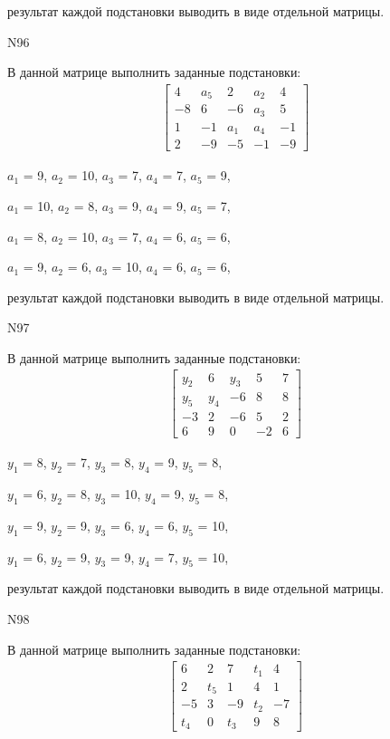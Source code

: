 \documentclass[11pt]{report}
\begin{document}
результат каждой подстановки выводить в виде отдельной матрицы.

N96

В данной матрице выполнить заданные подстановки:
\begin{align*}
\left[\begin{matrix}4 & a_{5} & 2 & a_{2} & 4\\-8 & 6 & -6 & a_{3} & 5\\1 & -1 & a_{1} & a_{4} & -1\\2 & -9 & -5 & -1 & -9\end{matrix}\right]
\end{align*}


$a_{1}$ = 9, $a_{2}$ = 10, $a_{3}$ = 7, $a_{4}$ = 7, $a_{5}$ = 9, 

$a_{1}$ = 10, $a_{2}$ = 8, $a_{3}$ = 9, $a_{4}$ = 9, $a_{5}$ = 7, 

$a_{1}$ = 8, $a_{2}$ = 10, $a_{3}$ = 7, $a_{4}$ = 6, $a_{5}$ = 6, 

$a_{1}$ = 9, $a_{2}$ = 6, $a_{3}$ = 10, $a_{4}$ = 6, $a_{5}$ = 6, 

результат каждой подстановки выводить в виде отдельной матрицы.

N97

В данной матрице выполнить заданные подстановки:
\begin{align*}
\left[\begin{matrix}y_{2} & 6 & y_{3} & 5 & 7\\y_{5} & y_{4} & -6 & 8 & 8\\-3 & 2 & -6 & 5 & 2\\6 & 9 & 0 & -2 & 6\end{matrix}\right]
\end{align*}


$y_{1}$ = 8, $y_{2}$ = 7, $y_{3}$ = 8, $y_{4}$ = 9, $y_{5}$ = 8, 

$y_{1}$ = 6, $y_{2}$ = 8, $y_{3}$ = 10, $y_{4}$ = 9, $y_{5}$ = 8, 

$y_{1}$ = 9, $y_{2}$ = 9, $y_{3}$ = 6, $y_{4}$ = 6, $y_{5}$ = 10, 

$y_{1}$ = 6, $y_{2}$ = 9, $y_{3}$ = 9, $y_{4}$ = 7, $y_{5}$ = 10, 

результат каждой подстановки выводить в виде отдельной матрицы.

N98

В данной матрице выполнить заданные подстановки:
\begin{align*}
\left[\begin{matrix}6 & 2 & 7 & t_{1} & 4\\2 & t_{5} & 1 & 4 & 1\\-5 & 3 & -9 & t_{2} & -7\\t_{4} & 0 & t_{3} & 9 & 8\end{matrix}\right]
\end{align*}
\end{document}
